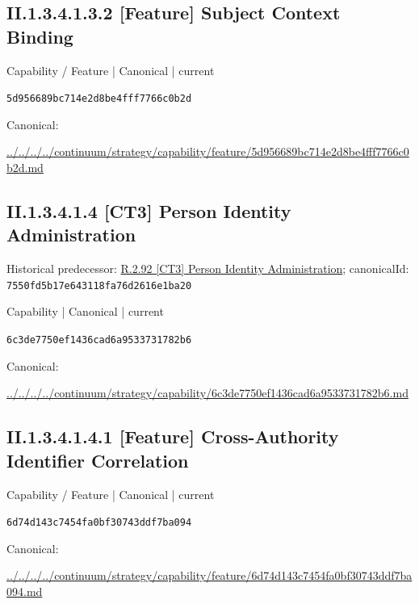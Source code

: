 \documentclass[10pt,a4paper]{article}
\begin{document}
\subsection*{II.1.3.4.1.3.2 [Feature] Subject Context Binding}
\label{element-5d956689bc714e2d8be4fff7766c0b2d}
{\small Capability / Feature | Canonical | current}\par
\texttt{5d956689bc714e2d8be4fff7766c0b2d}\par
Canonical: \par
{\footnotesize\url{../../../../continuum/strategy/capability/feature/5d956689bc714e2d8be4fff7766c0b2d.md}}\par
\subsection*{II.1.3.4.1.4 [CT3] Person Identity Administration}
Historical predecessor: \hyperref[element-7550fd5b17e643118fa76d2616e1ba20]{R.2.92 [CT3] Person Identity Administration}; canonicalId: \texttt{7550fd5b17e643118fa76d2616e1ba20}\par
\label{element-6c3de7750ef1436cad6a9533731782b6}
{\small Capability | Canonical | current}\par
\texttt{6c3de7750ef1436cad6a9533731782b6}\par
Canonical: \par
{\footnotesize\url{../../../../continuum/strategy/capability/6c3de7750ef1436cad6a9533731782b6.md}}\par
\subsection*{II.1.3.4.1.4.1 [Feature] Cross-Authority Identifier Correlation}
\label{element-6d74d143c7454fa0bf30743ddf7ba094}
{\small Capability / Feature | Canonical | current}\par
\texttt{6d74d143c7454fa0bf30743ddf7ba094}\par
Canonical: \par
{\footnotesize\url{../../../../continuum/strategy/capability/feature/6d74d143c7454fa0bf30743ddf7ba094.md}}\par
\end{document}
